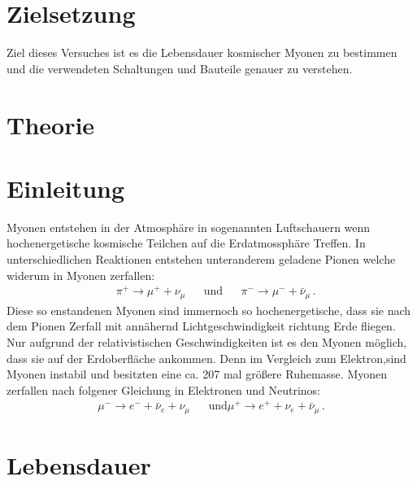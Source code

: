 \section{Zielsetzung}
    Ziel dieses Versuches ist es die Lebensdauer kosmischer Myonen zu bestimmen und die verwendeten Schaltungen und Bauteile genauer zu verstehen.

\section{Theorie}

    \section{Einleitung}
        Myonen entstehen in der Atmosphäre in sogenannten Luftschauern wenn hochenergetische kosmische Teilchen auf die Erdatmossphäre Treffen.
        In unterschiedlichen Reaktionen entstehen unteranderem geladene Pionen welche widerum in Myonen zerfallen:
        \begin{align}
            &\pi^+ \rightarrow \mu^+ + \nu_\mu && \text{und} && \pi^- \rightarrow \mu^- + \bar{\nu}_\mu \, .
        \end{align}
        Diese so enstandenen Myonen sind immernoch so hochenergetische, dass sie nach dem Pionen Zerfall mit annähernd Lichtgeschwindigkeit richtung Erde fliegen.
        Nur aufgrund der relativistischen Geschwindigkeiten ist es den Myonen möglich, dass sie auf der Erdoberfläche ankommen. 
        Denn im Vergleich zum Elektron,sind Myonen instabil und besitzten eine ca. 207 mal größere Ruhemasse. 
        Myonen zerfallen nach folgener Gleichung in Elektronen und Neutrinos:
        \begin{align}
            \mu^- \rightarrow e^- + \bar{\nu}_e + \nu_\mu && \text{und} \mu^+ \rightarrow e^+ + \nu_e + \bar{\nu}_\mu \, . 
        \end{align} 

    \section{Lebensdauer}

